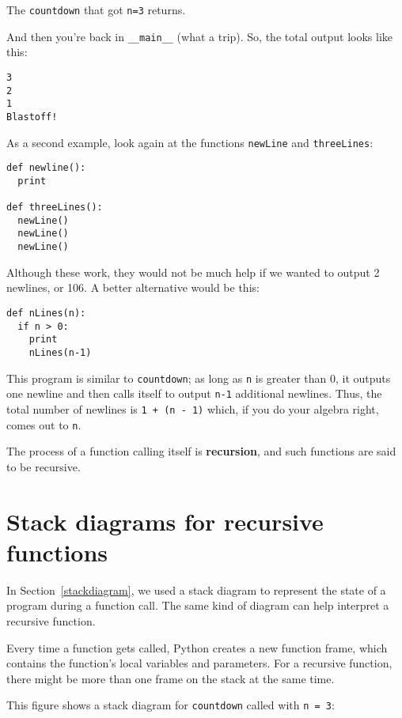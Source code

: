 The {\tt countdown} that got {\tt n=3} returns.

And then you're back in {\tt \_\_main\_\_} (what a trip).  So, the
total output looks like this:

\beforeverb
\begin{verbatim}
3
2
1
Blastoff!
\end{verbatim}
\afterverb
%
As a second example, look again at the functions {\tt newLine} and
{\tt threeLines}:

\beforeverb
\begin{verbatim}
def newline():
  print

def threeLines():
  newLine()
  newLine()
  newLine()
\end{verbatim}
\afterverb
%
Although these work, they would not be much help if we wanted to output 2
newlines, or 106.  A better alternative would be this:

\beforeverb
\begin{verbatim}
def nLines(n):
  if n > 0:
    print
    nLines(n-1)
\end{verbatim}
\afterverb
%
This program is similar to {\tt countdown}; as long as {\tt n} is
greater than 0, it outputs one newline and then calls itself to
output {\tt n-1} additional newlines.  Thus, the total number of
newlines is {\tt 1 + (n - 1)} which, if you do your algebra right, comes
out to {\tt n}.

The process of a function calling itself is {\bf recursion}, and
such functions are said to be recursive.



\section{Stack diagrams for recursive functions}

In Section~\ref{stackdiagram}, we used a stack diagram to represent
the state of a program during a function call.  The same kind of
diagram can help interpret a recursive function.

Every time a function gets called, Python creates a new function
frame, which contains the function's local variables and parameters.
For a recursive function, there might be more than one frame on the
stack at the same time.

This figure shows a stack diagram for {\tt countdown} called with
{\tt n = 3}:

\beforefig
\centerline{}
\afterfig

